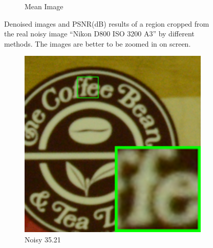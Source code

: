 \begin{figure}
\begin{subfigure}[t]{0.19\textwidth}
\caption{Mean Image}
    \end{subfigure}
    \caption{Denoised images and PSNR(dB) results of a region cropped from the real noisy image ``Nikon D800 ISO 3200 A3'' \cite{crosschannel2016} by different methods. The images are better to be zoomed in on screen.}
    \label{fig3-15}
\end{figure}

\begin{figure}
    \centering
    \begin{subfigure}[t]{0.19\textwidth}
        \centering
        \includegraphics[width=1\textwidth]{images/guided/cc60/resize_br_Noisy_CC_Noisy_Nikon_D800_ISO_1600_B2_109.png}
		\caption{Noisy 35.21}
    \end{subfigure}
    \hfill
    \begin{subfigure}[t]{0.19\textwidth}
        \centering

\end{subfigure}
\end{figure}
